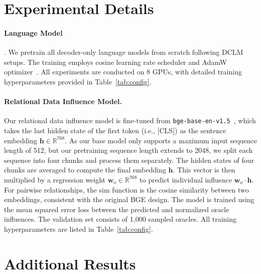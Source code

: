 
\section{Experimental Details}
\label{sec:exp-details}



\paragraph{Language Model}. We pretrain all decoder-only language models from scratch following DCLM setups. The training employs cosine learning rate scheduler and AdamW optimizer~\cite{KingBa15}. All experiments are conducted on 8 GPUs, with detailed training hyperparameters provided in Table~\ref{tab:config}.

\paragraph{Relational Data Influence Model.} Our relational data influence model is fine-tuned from \texttt{bge-base-en-v1.5}~\cite{xiao2024bge}, which takes the last hidden state of the first token (i.e., [CLS]) as the sentence embedding $\textbf{h} \in \mathbb{R}^{768}$. As our base model only supports a maximum input sequence length of 512, but our pretraining sequence length extends to 2048, we split each sequence into four chunks and process them separately. The hidden states of four chunks are averaged to compute the final embedding $\textbf{h}$. This vector is then multiplied by a regression weight $\textbf{w}_o \in \mathbb{R}^{768}$ to predict individual influence $\textbf{w}_o\cdot\textbf{h}$. For pairwise relationships, the sim function is the cosine similarity between two embeddings, consistent with the original BGE design. The model is trained using the mean squared error loss between the predicted and normalized oracle influences. The validation set consists of 1,000 sampled oracles. All training hyperparameters are listed in Table~\ref{tab:config}.

\section{Additional Results}
\label{sec:additional}

